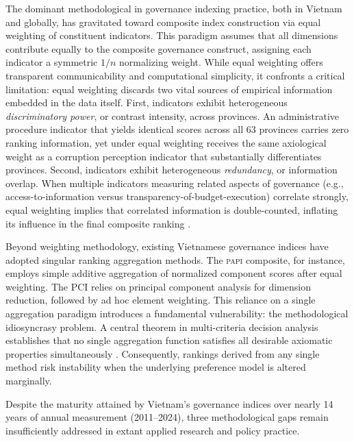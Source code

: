 \documentclass[12pt,a4paper]{article}
\newcommand{\PAPI}{\textsc{papi}\xspace}
\begin{document}
The dominant methodological in governance indexing practice, both in Vietnam and globally, has gravitated toward composite index construction via equal weighting of constituent indicators. This paradigm assumes that all dimensions contribute equally to the composite governance construct, assigning each indicator a symmetric $1/n$ normalizing weight. While equal weighting offers transparent communicability and computational simplicity, it confronts a critical limitation: equal weighting discards two vital sources of empirical information embedded in the data itself. First, indicators exhibit heterogeneous \emph{discriminatory power}, or contrast intensity, across provinces. An administrative procedure indicator that yields identical scores across all 63 provinces carries zero ranking information, yet under equal weighting receives the same axiological weight as a corruption perception indicator that substantially differentiates provinces. Second, indicators exhibit heterogeneous \emph{redundancy}, or information overlap. When multiple indicators measuring related aspects of governance (e.g., access-to-information versus transparency-of-budget-execution) correlate strongly, equal weighting implies that correlated information is double-counted, inflating its influence in the final composite ranking \citep{Diakoulaki1995, Greco2016}.

Beyond weighting methodology, existing Vietnamese governance indices have adopted singular ranking aggregation methods. The \PAPI composite, for instance, employs simple additive aggregation of normalized component scores after equal weighting. The PCI relies on principal component analysis for dimension reduction, followed by ad hoc element weighting. This reliance on a single aggregation paradigm introduces a fundamental vulnerability: the methodological idiosyncrasy problem. A central theorem in multi-criteria decision analysis establishes that no single aggregation function satisfies all desirable axiomatic properties simultaneously \citep{Arrow1951, Bouyssou2000}. Consequently, rankings derived from any single method risk instability when the underlying preference model is altered marginally.


Despite the maturity attained by Vietnam's governance indices over nearly 14 years of annual measurement (2011--2024), three methodological gaps remain insufficiently addressed in extant applied research and policy practice.
\end{document}

